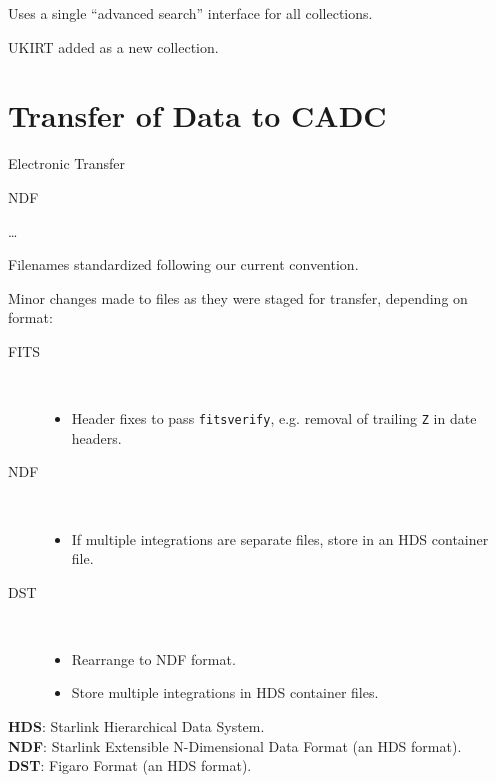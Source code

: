 \documentclass[11pt,twoside]{article}
\begin{document}
Uses a single ``advanced search'' interface for all collections.

UKIRT added as a new collection.

\section{Transfer of Data to CADC}

Electronic Transfer \citep{2005ASPC..347..647M}

NDF \citep[see, for example,][]{P91_adassxxiii}

\ldots

Filenames standardized following our current convention.

Minor changes made to files as they were staged for transfer,
depending on format:

\begin{description}
\item[FITS] \quad \\

\begin{itemize}
\item
Header fixes to pass \texttt{fitsverify},
e.g. removal of trailing \texttt{Z} in date headers.
\end{itemize}

\item[NDF] \quad \\

\begin{itemize}
\item
If multiple integrations are separate files,
store in an HDS container file.
\end{itemize}

\item[DST] \quad \\

\begin{itemize}
\item
Rearrange to NDF format.

\item
Store multiple integrations in HDS container files.
\end{itemize}
\end{description}

\textbf{HDS}: Starlink Hierarchical Data System. \\
\textbf{NDF}: Starlink Extensible N-Dimensional Data Format (an HDS format). \\
\textbf{DST}: Figaro Format (an HDS format). \\
\end{document}
